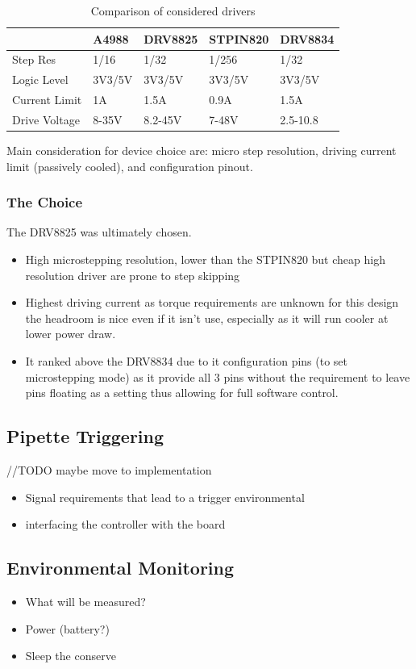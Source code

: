 \begin{table}[h]
    \centering
    \begin{tabular}{|l|l|l|l|l|}
        \hline
        \textbf{}     & \textbf{A4988} & \textbf{DRV8825} & \textbf{STPIN820} & \textbf{DRV8834} \\ \hline
        Step Res      & 1/16           & 1/32             & 1/256             & 1/32             \\ \hline
        Logic Level   & 3V3/5V         & 3V3/5V           & 3V3/5V            & 3V3/5V           \\ \hline
        Current Limit & 1A             & 1.5A             & 0.9A              & 1.5A             \\ \hline
        Drive Voltage & 8-35V          & 8.2-45V          & 7-48V             & 2.5-10.8         \\ \hline
    \end{tabular}
    \caption{Comparison of considered drivers}
\end{table}

Main consideration for device choice are: micro step resolution, driving current limit (passively cooled), and configuration pinout.

\subsubsection*{The Choice}
The DRV8825 was ultimately chosen.
\begin{itemize}
    \item High microstepping resolution, lower than the STPIN820 but cheap high resolution driver are prone to step skipping \cite{step_book}
    \item Highest driving current as torque requirements are unknown for this design the headroom is nice even if it isn't use, especially as it will run cooler at lower power draw.
    \item It ranked above the DRV8834 due to it configuration pins (to set microstepping mode) as it provide all 3 pins without the requirement to leave pins floating as a setting thus allowing for full software control.
\end{itemize}

\subsection{Pipette Triggering}

//TODO maybe move to implementation
\begin{itemize}
    \item Signal requirements that lead to a trigger environmental
    \item interfacing the controller with the board
\end{itemize}

\subsection{Environmental Monitoring}
\begin{itemize} 
    \item What will be measured?
    \item Power (battery?)
    \item Sleep the conserve
\end{itemize}
